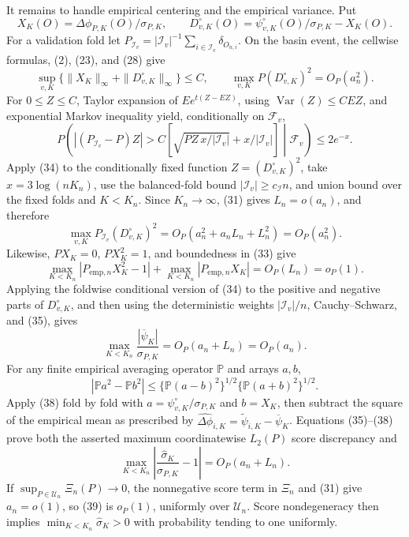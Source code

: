 It remains to handle empirical centering and the empirical variance.  Put
\[
 X_K(O)=\Delta\phi_{P,K}(O)/\sigma_{P,K},\qquad
 D_{v,K}^{\circ}(O)=\psi_{v,K}^{\circ}(O)/\sigma_{P,K}-X_K(O).
\]
For a validation fold let \(P_{\mathcal I_v}=|\mathcal I_v|^{-1}\sum_{i\in\mathcal I_v}\delta_{O_{n,i}}\).  On the basin event, the cellwise formulas, (2), (23), and (28) give
\[
 \sup_{v,K}\{\|X_K\|_\infty+\|D_{v,K}^{\circ}\|_\infty\}\leq C,
 \qquad \max_{v,K}P(D_{v,K}^{\circ})^2=O_P(a_n^2).                         \tag{33}
\]
For \(0\leq Z\leq C\), Taylor expansion of \(Ee^{t(Z-EZ)}\), using \(\operatorname{Var}(Z)\leq CEZ\), and exponential Markov inequality yield, conditionally on \(\mathcal F_v\),
\[
 P\!\left(\left|(P_{\mathcal I_v}-P)Z\right|>
 C\left[\sqrt{PZ\,x/|\mathcal I_v|}+x/|\mathcal I_v|\right]
 \middle|\mathcal F_v\right)\leq2e^{-x}.                                  \tag{34}
\]
Apply (34) to the conditionally fixed function \(Z=(D_{v,K}^{\circ})^2\), take \(x=3\log(nK_n)\), use the balanced-fold bound \(|\mathcal I_v|\geq c_{\mathcal I}n\), and union bound over the fixed folds and \(K<K_n\).  Since \(K_n\to\infty\), (31) gives \(L_n=o(a_n)\), and therefore
\[
 \max_{v,K}P_{\mathcal I_v}(D_{v,K}^{\circ})^2
 =O_P\!\left(a_n^2+a_nL_n+L_n^2\right)=O_P(a_n^2).                         \tag{35}
\]
Likewise, \(PX_K=0\), \(PX_K^2=1\), and boundedness in (33) give
\[
 \max_{K<K_n}|P_{\mathrm{emp},n}X_K^2-1|
 +\max_{K<K_n}|P_{\mathrm{emp},n}X_K|=O_P(L_n)=o_P(1).                    \tag{36}
\]
Applying the foldwise conditional version of (34) to the positive and negative parts of \(D_{v,K}^{\circ}\), and then using the deterministic weights \(|\mathcal I_v|/n\), Cauchy--Schwarz, and (35), gives
\[
 \max_{K<K_n}\frac{|\overline\psi_K|}{\sigma_{P,K}}
 =O_P(a_n+L_n)=O_P(a_n).                                                     \tag{37}
\]
For any finite empirical averaging operator \(\mathbb P\) and arrays \(a,b\),
\[
 |\mathbb P a^2-\mathbb P b^2|
 \leq\{\mathbb P(a-b)^2\}^{1/2}\{\mathbb P(a+b)^2\}^{1/2}.              \tag{38}
\]
Apply (38) fold by fold with \(a=\psi_{v,K}^{\circ}/\sigma_{P,K}\) and \(b=X_K\), then subtract the square of the empirical mean as prescribed by \(\widehat{\Delta\phi}_{i,K}=\widetilde\psi_{i,K}-\overline\psi_K\).  Equations (35)--(38) prove both the asserted maximum coordinatewise \(L_2(P)\) score discrepancy and
\[
 \max_{K<K_n}\left|\frac{\widehat\sigma_K}{\sigma_{P,K}}-1\right|
 =O_P(a_n+L_n).                                                              \tag{39}
\]
If \(\sup_{P\in\mathcal U_n}\Xi_n(P)\to0\), the nonnegative score term in \(\Xi_n\) and (31) give \(a_n=o(1)\), so (39) is \(o_P(1)\), uniformly over \(\mathcal U_n\).  Score nondegeneracy then implies \(\min_{K<K_n}\widehat\sigma_K>0\) with probability tending to one uniformly.

